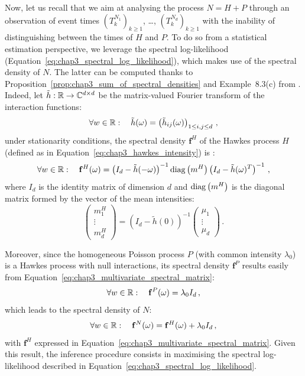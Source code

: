 	      Now, let us recall that we aim at analysing the process $N = H + P$ through an observation of event times $(T_k^{N_1})_{k\geq1}$, \dots, $(T_k^{N_d})_{k\geq1}$ with the inability of distinguishing between the times of $H$ and $P$.
	      To do so from a statistical estimation perspective, we leverage the spectral log-likelihood (Equation~\eqref{eq:chap3_spectral_log_likelihood}), which makes use of the spectral density of $N$.
	      The latter can be computed thanks to Proposition~\ref{prop:chap3_sum_of_spectral_densities} and Example~8.3(c) from \textcite{DaleyV1}.
	      Indeed, let $\tilde h : {\mathbb R} \to \mathbb C^{d \times d}$ be the matrix-valued Fourier transform of the interaction functions:
	      \[
	        \forall w \in {\mathbb R}: \quad
	        \tilde h(\omega) = \left( \tilde h_{ij}(\omega) \right)_{1 \le i, j \le d} \,,
	      \]
	      under stationarity conditions, 
	      the spectral density $\mathbf{f}^H$ of the Hawkes process $H$ (defined as in Equation~\eqref{eq:chap3_hawkes_intensity}) is \parencite[Equation (8.3.11)]{DaleyV1}:
	      \begin{equation}\label{eq:chap3_multivariate_spectral_matrix}
	        \forall w \in {\mathbb R}: \quad
          \mathbf{f}^H(\omega) = \left( I_d - \tilde h(-\omega) \right)^{-1} \operatorname{diag} \left(m^H \right) \left(I_d - \tilde h(\omega)^T \right)^{-1}\,,
        \end{equation}
        where $I_d$ is the identity matrix of dimension $d$ and $\operatorname{diag} \left(m^H \right)$ is the diagonal matrix formed by the vector of the mean intensities:
        \[
          \begin{pmatrix}
            m_1^H\\
            \vdots\\
            m_d^H
          \end{pmatrix}
          = \left( I_d - \tilde h(0) \right)^{-1} 
          \begin{pmatrix}
            \mu_1\\
            \vdots\\
            \mu_d
          \end{pmatrix}\,.
        \]
        
        Moreover, since the homogeneous Poisson process $P$ (with common intensity \(\lambda_0\)) is a Hawkes process with null interactions,
        its spectral density \(\mathbf f^P\) results easily from Equation~\eqref{eq:chap3_multivariate_spectral_matrix}:
        \[
          \forall w \in {\mathbb R}: \quad
          \mathbf{f}^P(\omega) = \lambda_0 I_d \,,
        \]
        which leads to the spectral density of $N$:        
        \begin{equation}\label{eq:chap3_noisy_spectral_matrix}
          \forall w \in {\mathbb R}: \quad
          \mathbf{f}^N(\omega)
          = \mathbf{f}^H(\omega) + \lambda_0 I_d \, ,
        \end{equation}
        with $\mathbf{f}^H$ expressed in Equation~\eqref{eq:chap3_multivariate_spectral_matrix}.
        Given this result, the inference procedure consists in maximising the spectral log-likelihood described in Equation~\eqref{eq:chap3_spectral_log_likelihood}.
        
